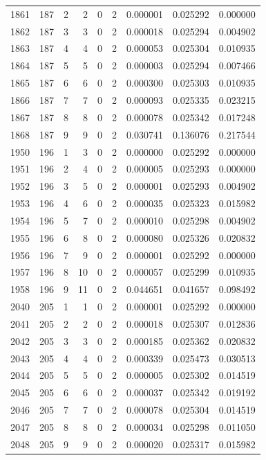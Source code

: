 \begin{longtable}{rrrrrrrrr}
1861 & 187 & 2 & 2 & 0 & 2 & 0.000001 & 0.025292 & 0.000000 \\
1862 & 187 & 3 & 3 & 0 & 2 & 0.000018 & 0.025294 & 0.004902 \\
1863 & 187 & 4 & 4 & 0 & 2 & 0.000053 & 0.025304 & 0.010935 \\
1864 & 187 & 5 & 5 & 0 & 2 & 0.000003 & 0.025294 & 0.007466 \\
1865 & 187 & 6 & 6 & 0 & 2 & 0.000300 & 0.025303 & 0.010935 \\
1866 & 187 & 7 & 7 & 0 & 2 & 0.000093 & 0.025335 & 0.023215 \\
1867 & 187 & 8 & 8 & 0 & 2 & 0.000078 & 0.025342 & 0.017248 \\
1868 & 187 & 9 & 9 & 0 & 2 & 0.030741 & 0.136076 & 0.217544 \\
1950 & 196 & 1 & 3 & 0 & 2 & 0.000000 & 0.025292 & 0.000000 \\
1951 & 196 & 2 & 4 & 0 & 2 & 0.000005 & 0.025293 & 0.000000 \\
1952 & 196 & 3 & 5 & 0 & 2 & 0.000001 & 0.025293 & 0.004902 \\
1953 & 196 & 4 & 6 & 0 & 2 & 0.000035 & 0.025323 & 0.015982 \\
1954 & 196 & 5 & 7 & 0 & 2 & 0.000010 & 0.025298 & 0.004902 \\
1955 & 196 & 6 & 8 & 0 & 2 & 0.000080 & 0.025326 & 0.020832 \\
1956 & 196 & 7 & 9 & 0 & 2 & 0.000001 & 0.025292 & 0.000000 \\
1957 & 196 & 8 & 10 & 0 & 2 & 0.000057 & 0.025299 & 0.010935 \\
1958 & 196 & 9 & 11 & 0 & 2 & 0.044651 & 0.041657 & 0.098492 \\
2040 & 205 & 1 & 1 & 0 & 2 & 0.000001 & 0.025292 & 0.000000 \\
2041 & 205 & 2 & 2 & 0 & 2 & 0.000018 & 0.025307 & 0.012836 \\
2042 & 205 & 3 & 3 & 0 & 2 & 0.000185 & 0.025362 & 0.020832 \\
2043 & 205 & 4 & 4 & 0 & 2 & 0.000339 & 0.025473 & 0.030513 \\
2044 & 205 & 5 & 5 & 0 & 2 & 0.000005 & 0.025302 & 0.014519 \\
2045 & 205 & 6 & 6 & 0 & 2 & 0.000037 & 0.025342 & 0.019192 \\
2046 & 205 & 7 & 7 & 0 & 2 & 0.000078 & 0.025304 & 0.014519 \\
2047 & 205 & 8 & 8 & 0 & 2 & 0.000034 & 0.025298 & 0.011050 \\
2048 & 205 & 9 & 9 & 0 & 2 & 0.000020 & 0.025317 & 0.015982 \\

\end{longtable}

